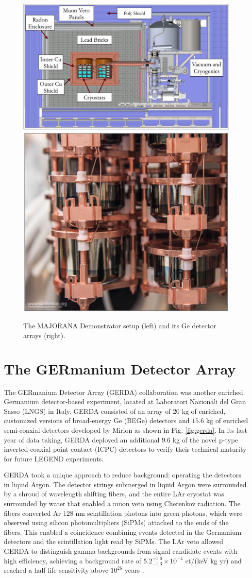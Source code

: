 \begin{figure}
  \centering
  \includegraphics[height=0.34\columnwidth]{ch2/figs/mjd_setup.pdf}
  \qquad
  \includegraphics[height=0.34\columnwidth]{ch2/figs/mjd_ppc_array.pdf}
  \caption{The MAJORANA Demonstrator setup (left) and its Ge detector arrays (right).}
    \label{fig:mjd}
  \end{figure}
 
\section{The GERmanium Detector Array}

The GERmanium Detector Array (GERDA) collaboration was another enriched Germanium detector-based experiment, located at Laboratori Nazionali del Gran Sasso (LNGS) in Italy. GERDA consisted of an array of $20$ kg of enriched, customized versions of broad-energy Ge (BEGe) detectors and $15.6$ kg of enriched semi-coaxial detectors developed by Mirion as shown in Fig. \ref{fig:gerda}. In its last year of data taking, GERDA deployed an additional $9.6$ kg of the novel p-type inverted-coaxial point-contact (ICPC) detectors to verify their technical maturity for future LEGEND experiments.

GERDA took a unique approach to reduce background: operating the detectors in liquid Argon. The detector strings submerged in liquid Argon were surrounded by a shroud of wavelength shifting fibers, and the entire LAr cryostat was surrounded by water that enabled a muon veto using Cherenkov radiation. The fibers converted Ar $128$ nm scintillation photons into green photons, which were observed using silicon photomultipliers (SiPMs) attached to the ends of the fibers. This enabled a coincidence combining events detected in the Germanium detectors and the scintillation light read by SiPMs. The LAr veto allowed GERDA to distinguish gamma backgrounds from {\onbb} signal candidate events with high efficiency, achieving a background rate of $5.2^{+1.6}_{-1.3}\times 10^{-4}$ ct/(keV kg yr) and reached a half-life sensitivity above $10^{26}$ years \cite{GERDA_final}.

